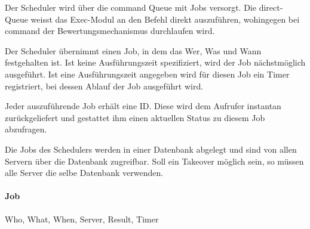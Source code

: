 Der Scheduler wird über die command Queue mit
Jobs versorgt. Die direct-Queue weisst das Exec-Modul an den Befehl direkt
auszuführen, wohingegen bei command der Bewertungsmechanismus durchlaufen
wird.

Der Scheduler übernimmt einen Job, in dem das Wer, Was und Wann
festgehalten ist. Ist keine Ausführungszeit spezifiziert, wird der
Job nächstmöglich ausgeführt. Ist eine Ausführungszeit angegeben
wird für diesen Job ein Timer registriert, bei dessen Ablauf der
Job ausgeführt wird.

Jeder auszuführende Job erhält eine ID. Diese wird dem Aufrufer
instantan zurückgeliefert und gestattet ihm einen aktuellen Status
zu diesem Job abzufragen.

Die Jobs des Schedulers werden in einer Datenbank abgelegt und sind von
allen Servern über die Datenbank zugreifbar. Soll ein Takeover möglich
sein, so müssen alle Server die selbe Datenbank verwenden.

\paragraph{Job}

Who, What, When, Server, Result, Timer

